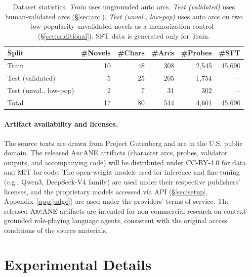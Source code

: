 \documentclass[11pt]{article}
\newcommand{\ours}{\textsc{ArcANE}}
\begin{document}
\begin{table}[t]
\centering
\scriptsize
\setlength{\tabcolsep}{4pt}
\renewcommand{\arraystretch}{0.9}
\setlength{\aboverulesep}{0.2ex}
\setlength{\belowrulesep}{0.2ex}
\begin{tabular}{lrrrrr}
\toprule
Split & \#Novels & \#Chars & \#Arcs & \#Probes & \#SFT \\
\midrule
Train                       & 10 & 48 &  308 & 2{,}545 & 45{,}690 \\
Test (validated)            &  5 & 25 &  205 & 1{,}754 & --       \\
Test (unval., low-pop)      &  2 &  7 &   31 &   302   & --       \\
\midrule
Total                       & 17 & 80 &  544 & 4{,}601 & 45{,}690 \\
\bottomrule
\end{tabular}
\caption{Dataset statistics. \emph{Train} uses ungrounded auto arcs. \emph{Test (validated)} uses human-validated arcs (\S\ref{sec:arc}). \emph{Test (unval., low-pop)} uses auto arcs on two low-popularity unvalidated novels as a memorization control~\cite{han-etal-2026-quantifying} (\S\ref{sec:additional}). SFT data is generated only for Train.}
\label{tab:data_stats}
\end{table}

\paragraph{Artifact availability and licenses.}
The source texts are drawn from Project Gutenberg and are in the U.S. public domain. The released \ours{} artifacts (character arcs, probes, validator outputs, and accompanying code) will be distributed under CC-BY-4.0 for data and MIT for code. The open-weight models used for inference and fine-tuning (e.g., Qwen3, DeepSeek-V4 family) are used under their respective publishers' licenses, and the proprietary models accessed via API (\S\ref{sec:setup}, Appendix~\ref{app:judge}) are used under the providers' terms of service. The released \ours{} artifacts are intended for non-commercial research on context-grounded role-playing language agents, consistent with the original access conditions of the source materials.

\section{Experimental Details}
\label{app:training_details}
\end{document}
